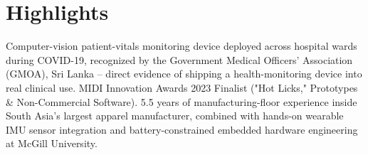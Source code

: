 \documentclass[11pt]{article}
\begin{document}
\enlargethispage{4\baselineskip}
\section*{Highlights}
Computer-vision patient-vitals monitoring device deployed across hospital wards during COVID-19, recognized by the Government Medical Officers' Association (GMOA), Sri Lanka -- direct evidence of shipping a health-monitoring device into real clinical use. MIDI Innovation Awards 2023 Finalist ("Hot Licks," Prototypes \& Non-Commercial Software). 5.5 years of manufacturing-floor experience inside South Asia's largest apparel manufacturer, combined with hands-on wearable IMU sensor integration and battery-constrained embedded hardware engineering at McGill University.
\end{document}
